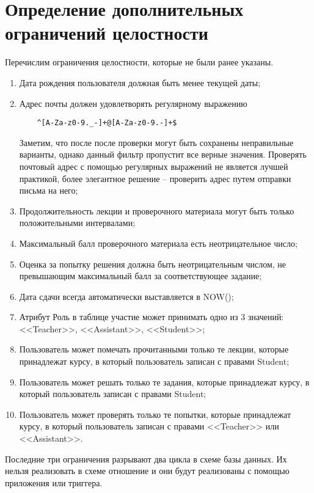 \documentclass[a4paper,14pt]{article}
\begin{document}
\section{Определение дополнительных ограничений целостности}
Перечислим ограничения целостности, которые не были ранее указаны.
\begin{enumerate}
	\item Дата рождения пользователя должная быть менее текущей даты;
	\item Адрес почты должен удовлетворять регулярному выражению 
	
	\begin{lstlisting}	
	^[A-Za-z0-9._-]+@[A-Za-z0-9.-]+$
	\end{lstlisting}
	
	Заметим, что после после проверки могут быть сохранены неправильные варианты, однако данный фильтр пропустит все верные значения.
	Проверять почтовый адрес с помощью регулярных выражений не является лучшей практикой, более элегантное решение -- проверить адрес путем отправки письма на него;
	\item  Продолжительность лекции и проверочного материала могут быть только положительными интервалами;
	\item Максимальный балл проверочного материала есть неотрицательное число;
	\item Оценка за попытку решения должна быть неотрицательным числом, не превышающим максимальный балл за соответствующее задание;
	\item Дата сдачи всегда автоматически выставляется в NOW();
	\item Атрибут Роль в таблице участие может принимать одно из 3 значений: <<Teacher>>, <<Assistant>>, <<Student>>;
	\item Пользователь может помечать прочитанными только те лекции, которые принадлежат курсу, в который пользователь записан с правами Student;
	\item Пользователь может решать только те задания, которые принадлежат курсу, в который пользователь записан с правами Student;
	\item Пользователь может проверять только те попытки, которые принадлежат курсу, в который пользователь записан с правами <<Teacher>> или <<Assistant>>.
\end{enumerate}

Последние три ограничения разрывают два цикла в схеме базы данных.
Их нельзя реализовать в схеме отношение и они будут реализованы с помощью приложения или триггера.
\end{document}
